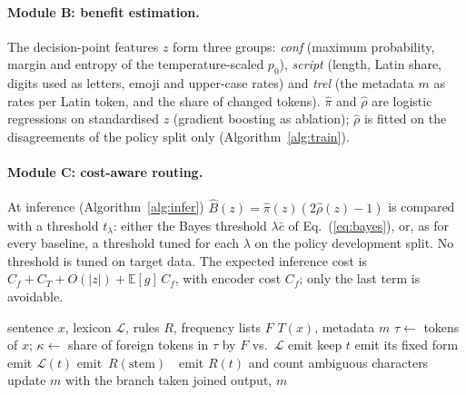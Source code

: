 \paragraph{Module B: benefit estimation.}
The decision-point features $z$ form three groups: \emph{conf} (maximum probability, margin and entropy of the temperature-scaled $p_0$), \emph{script} (length, Latin share, digits used as letters, emoji and upper-case rates) and \emph{trel} (the metadata $m$ as rates per Latin token, and the share of changed tokens). $\hat\pi$ and $\hat\rho$ are logistic regressions on standardised $z$ (gradient boosting as ablation); $\hat\rho$ is fitted on the disagreements of the policy split only (Algorithm~\ref{alg:train}).

\paragraph{Module C: cost-aware routing.}
At inference (Algorithm~\ref{alg:infer}) $\hat B(z)=\hat\pi(z)(2\hat\rho(z)-1)$ is compared with a threshold $t_\lambda$: either the Bayes threshold $\lambda\bar c$ of Eq.~(\ref{eq:bayes}), or, as for every baseline, a threshold tuned for each $\lambda$ on the policy development split. No threshold is tuned on target data. The expected inference cost is $C_f+C_T+O(|z|)+\mathbb E[g]\,C_f$, with encoder cost $C_f$; only the last term is avoidable.

\begin{algorithm}[t]
\small
\caption{Conservative normalisation $\Tcons$}
\label{alg:norm}
\begin{algorithmic}[1]
\Require sentence $x$, lexicon $\mathcal L$, rules $R$, frequency lists $F$
\Ensure $T(x)$, metadata $m$
\State $\tau\gets$ tokens of $x$; $\kappa\gets$ share of foreign tokens in $\tau$ by $F$ vs.\ $\mathcal L$
   emit 
   keep $t$
   emit its fixed form
   emit $\mathcal L(t)$
   emit \,$R(\text{stem})$\,
  \Else\ emit $R(t)$ and count ambiguous characters
  \EndIf
  \State update $m$ with the branch taken
\EndFor
\State \Return joined output, $m$
\end{algorithmic}
\end{algorithm}

